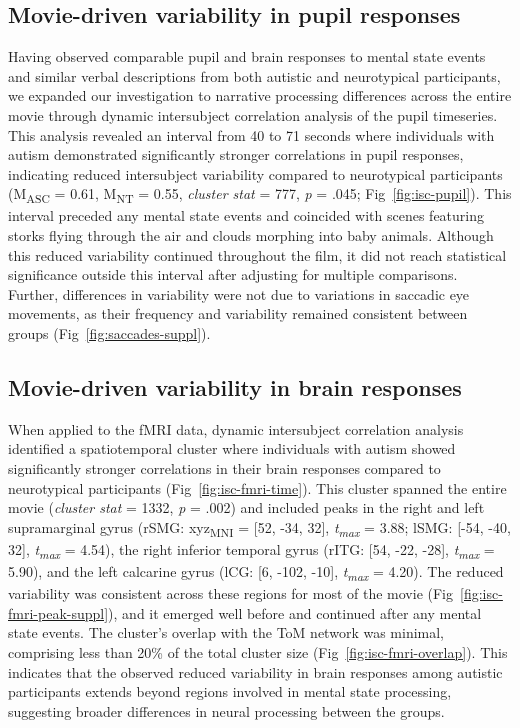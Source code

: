 \subsection{Movie-driven variability in pupil responses }
Having observed comparable pupil and brain responses to mental state events and similar verbal descriptions from both autistic and neurotypical participants, we expanded our investigation to narrative processing differences across the entire movie through dynamic intersubject correlation analysis of the pupil timeseries. This analysis revealed an interval from 40 to 71 seconds where individuals with autism demonstrated significantly stronger correlations in pupil responses, indicating reduced intersubject variability compared to neurotypical participants (M\textsubscript{ASC} = 0.61, M\textsubscript{NT} = 0.55, \textit{cluster stat} = 777, \textit{p} = .045; Fig~\ref{fig:isc-pupil}). This interval preceded any mental state events and coincided with scenes featuring storks flying through the air and clouds morphing into baby animals. Although this reduced variability continued throughout the film, it did not reach statistical significance outside this interval after adjusting for multiple comparisons. Further, differences in variability were not due to variations in saccadic eye movements, as their frequency and variability remained consistent between groups (Fig~\ref{fig:saccades-suppl}).



\subsection{Movie-driven variability in brain responses}
When applied to the fMRI data, dynamic intersubject correlation analysis identified a spatiotemporal cluster where individuals with autism showed significantly stronger correlations in their brain responses compared to neurotypical participants (Fig~\ref{fig:isc-fmri-time}). This cluster spanned the entire movie (\textit{cluster stat} = 1332, \textit{p} = .002) and included peaks in the right and left supramarginal gyrus (rSMG: xyz\textsubscript{MNI} = [52, -34, 32], \textit{t\textsubscript{max}} = 3.88; lSMG: [-54, -40, 32], \textit{t\textsubscript{max}} = 4.54), the right inferior temporal gyrus (rITG: [54, -22, -28], \textit{t\textsubscript{max}} = 5.90), and the left calcarine gyrus (lCG: [6, -102, -10], \textit{t\textsubscript{max}} = 4.20). The reduced variability was consistent across these regions for most of the movie (Fig~\ref{fig:isc-fmri-peak-suppl}), and it emerged well before and continued after any mental state events. The cluster's overlap with the ToM network was minimal, comprising less than 20\% of the total cluster size (Fig~\ref{fig:isc-fmri-overlap}). This indicates that the observed reduced variability in brain responses among autistic participants extends beyond regions involved in mental state processing, suggesting broader differences in neural processing between the groups.


